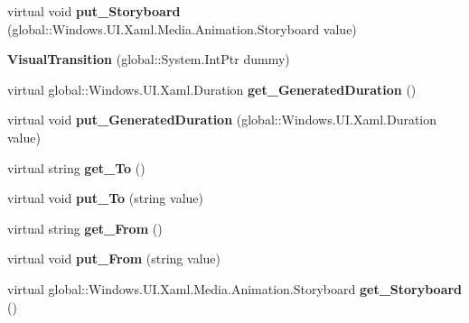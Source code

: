 \begin{DoxyCompactItemize}
virtual void {\bfseries put\+\_\+\+Storyboard} (global\+::\+Windows.\+U\+I.\+Xaml.\+Media.\+Animation.\+Storyboard value)
\item 
\mbox{\label{class_windows_1_1_u_i_1_1_xaml_1_1_visual_transition_a8e9584c6562711665f737ddc44600c07}} 
{\bfseries Visual\+Transition} (global\+::\+System.\+Int\+Ptr dummy)
\item 
\mbox{\label{class_windows_1_1_u_i_1_1_xaml_1_1_visual_transition_afb0659e34cd42d916c1086d04558a288}} 
virtual global\+::\+Windows.\+U\+I.\+Xaml.\+Duration {\bfseries get\+\_\+\+Generated\+Duration} ()
\item 
\mbox{\label{class_windows_1_1_u_i_1_1_xaml_1_1_visual_transition_a9425580c95693c7ee3d33464e68ce83f}} 
virtual void {\bfseries put\+\_\+\+Generated\+Duration} (global\+::\+Windows.\+U\+I.\+Xaml.\+Duration value)
\item 
\mbox{\label{class_windows_1_1_u_i_1_1_xaml_1_1_visual_transition_a0b343e8c15ba3f404cb2f2152e2af0fb}} 
virtual string {\bfseries get\+\_\+\+To} ()
\item 
\mbox{\label{class_windows_1_1_u_i_1_1_xaml_1_1_visual_transition_aa76ac64a1c186e375fd07fbef846cefd}} 
virtual void {\bfseries put\+\_\+\+To} (string value)
\item 
\mbox{\label{class_windows_1_1_u_i_1_1_xaml_1_1_visual_transition_a9aa7c36d0dc60308cfeda62679c8e084}} 
virtual string {\bfseries get\+\_\+\+From} ()
\item 
\mbox{\label{class_windows_1_1_u_i_1_1_xaml_1_1_visual_transition_af379d21f8a469ce2c38b93f7b387d5f3}} 
virtual void {\bfseries put\+\_\+\+From} (string value)
\item 
\mbox{\label{class_windows_1_1_u_i_1_1_xaml_1_1_visual_transition_ad0e85cd4965feb0bae3084eee6e188dc}} 
virtual global\+::\+Windows.\+U\+I.\+Xaml.\+Media.\+Animation.\+Storyboard {\bfseries get\+\_\+\+Storyboard} ()

\end{DoxyCompactItemize}
